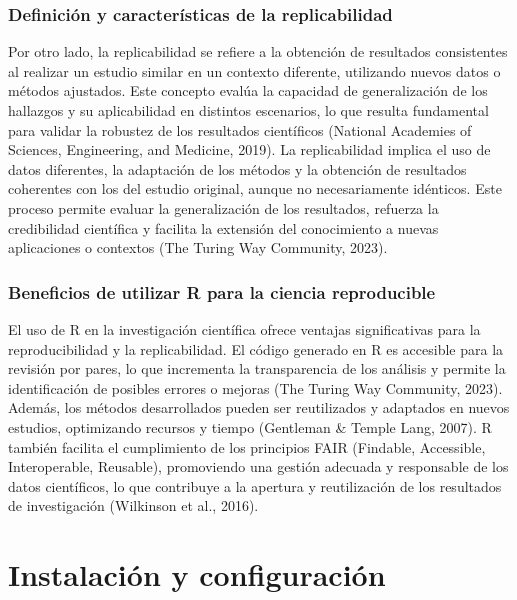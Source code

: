 \documentclass[
  spanish,
  a4paper,
  DIV=11,
  numbers=noendperiod,
  onepage,
  openany]{scrreprt}
\begin{document}
\subsection{Definición y características de la
replicabilidad}\label{definiciuxf3n-y-caracteruxedsticas-de-la-replicabilidad}

Por otro lado, la replicabilidad se refiere a la obtención de resultados
consistentes al realizar un estudio similar en un contexto diferente,
utilizando nuevos datos o métodos ajustados. Este concepto evalúa la
capacidad de generalización de los hallazgos y su aplicabilidad en
distintos escenarios, lo que resulta fundamental para validar la
robustez de los resultados científicos (National Academies of Sciences,
Engineering, and Medicine, 2019). La replicabilidad implica el uso de
datos diferentes, la adaptación de los métodos y la obtención de
resultados coherentes con los del estudio original, aunque no
necesariamente idénticos. Este proceso permite evaluar la generalización
de los resultados, refuerza la credibilidad científica y facilita la
extensión del conocimiento a nuevas aplicaciones o contextos (The Turing
Way Community, 2023).

\subsection{Beneficios de utilizar R para la ciencia
reproducible}\label{beneficios-de-utilizar-r-para-la-ciencia-reproducible}

El uso de R en la investigación científica ofrece ventajas
significativas para la reproducibilidad y la replicabilidad. El código
generado en R es accesible para la revisión por pares, lo que incrementa
la transparencia de los análisis y permite la identificación de posibles
errores o mejoras (The Turing Way Community, 2023). Además, los métodos
desarrollados pueden ser reutilizados y adaptados en nuevos estudios,
optimizando recursos y tiempo (Gentleman \& Temple Lang, 2007). R
también facilita el cumplimiento de los principios FAIR (Findable,
Accessible, Interoperable, Reusable), promoviendo una gestión adecuada y
responsable de los datos científicos, lo que contribuye a la apertura y
reutilización de los resultados de investigación (Wilkinson et al.,
2016).


\chapter{Instalación y
configuración}\label{instalaciuxf3n-y-configuraciuxf3n}
\end{document}
